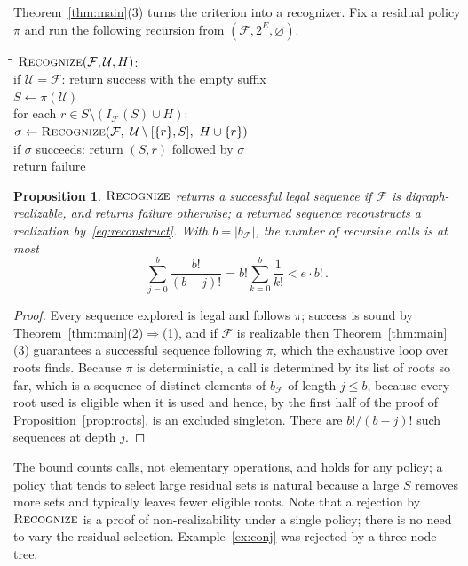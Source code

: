 \documentclass[11pt,a4paper]{article}
\theoremstyle{plain}
\newtheorem{proposition}[theorem]{Proposition}
\theoremstyle{definition}
\theoremstyle{remark}
\newcommand{\Rec}{\textup{\textsc{Recognize}}}
\newcommand{\cF}{\mathcal F}
\newcommand{\cU}{\mathcal U}
\newcommand{\Int}{I_{\cF}}
\newcommand{\ivl}[2]{[\{#1\},#2]}
\newcommand{\pw}[1]{2^{#1}}
\begin{document}
Theorem~\ref{thm:main}(3) turns the criterion into a recognizer. Fix a residual policy $\pi$ and run the following recursion from $(\cF,\pw{E},\varnothing)$.

\begin{center}
\begin{minipage}{0.86\textwidth}
\begin{tabbing}
\quad\=\quad\=\quad\=\kill
$\Rec(\cF,\cU,H)$:\\
\>if $\cU=\cF$: return success with the empty suffix\\
\>$S\leftarrow\pi(\cU)$\\
\>for each $r\in S\setminus(\Int(S)\cup H)$:\\
\>\>$\sigma\leftarrow\Rec(\cF,\ \cU\setminus\ivl{r}{S},\ H\cup\{r\})$\\
\>\>if $\sigma$ succeeds: return $(S,r)$ followed by $\sigma$\\
\>return failure
\end{tabbing}
\end{minipage}
\end{center}

\begin{proposition}\label{prop:recognizer}
$\Rec$ returns a successful legal sequence if $\cF$ is digraph-realizable, and returns failure otherwise; a returned sequence reconstructs a realization by~\eqref{eq:reconstruct}. With $b=|b_{\cF}|$, the number of recursive calls is at most
\begin{equation}\label{eq:treebound}
 \sum_{j=0}^{b}\frac{b!}{(b-j)!}=b!\sum_{k=0}^{b}\frac{1}{k!}<e\cdot b!\,.
\end{equation}
\end{proposition}

\begin{proof}
Every sequence explored is legal and follows $\pi$; success is sound by Theorem~\ref{thm:main}(2)$\Rightarrow$(1), and if $\cF$ is realizable then Theorem~\ref{thm:main}(3) guarantees a successful sequence following $\pi$, which the exhaustive loop over roots finds. Because $\pi$ is deterministic, a call is determined by its list of roots so far, which is a sequence of distinct elements of $b_{\cF}$ of length $j\le b$, because every root used is eligible when it is used and hence, by the first half of the proof of Proposition~\ref{prop:roots}, is an excluded singleton. There are $b!/(b-j)!$ such sequences at depth $j$.
\end{proof}

The bound counts calls, not elementary operations, and holds for any policy; a policy that tends to select large residual sets is natural because a large $S$ removes more sets and typically leaves fewer eligible roots. Note that a rejection by $\Rec$ is a proof of non-realizability under a single policy; there is no need to vary the residual selection. Example~\ref{ex:conj} was rejected by a three-node tree.
\end{document}
